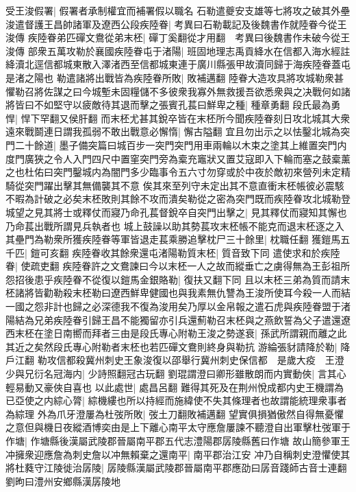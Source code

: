 受王浚假署|{
	假署者承制權宜而補署假以職名}
石勒遣夔安支雄等七將攻之破其外壘浚遣督護王昌帥諸軍及遼西公段疾陸眷|{
	考異曰石勒載記及後魏書作就陸眷今從王浚傳}
疾陸眷弟匹磾文鴦從弟末柸|{
	磾丁奚翻從才用翻　考異曰後魏書作未破今從王浚傳}
部衆五萬攻勒於襄國疾陸眷屯于渚陽|{
	班固地理志禹貢絳水在信都入海水經註絳瀆北逕信都城東散入澤渚西至信都城東連于廣川縣張甲故瀆同歸于海疾陸眷蓋屯是渚之陽也}
勒遣諸將出戰皆為疾陸眷所敗|{
	敗補邁翻}
陸眷大造攻具將攻城勒衆甚懼勒召將佐謀之曰今城塹未固糧儲不多彼衆我寡外無救援吾欲悉衆與之决戰何如諸將皆曰不如堅守以疲敵待其退而擊之張賓孔萇曰鮮卑之種|{
	種章勇翻}
段氏最為勇悍|{
	悍下罕翻又侯肝翻}
而末柸尤甚其銳卒皆在末柸所今聞疾陸眷刻日攻北城其大衆遠來戰鬬連日謂我孤弱不敢出戰意必懈惰|{
	懈古隘翻}
宜且勿出示之以怯鑿北城為突門二十餘道|{
	墨子備突篇曰城百步一突門突門用車兩輪以木束之塗其上維置突門内度門廣狹之令人入門四尺中置窐突門旁為槖充竈狀又置艾寇即入下輪而塞之鼓槖薰之也杜佑曰突門鑿城内為闇門多少臨事令五六寸勿穿或於中夜於敵初來營列未定精騎從突門躍出擊其無備襲其不意}
俟其來至列守未定出其不意直衝末柸帳彼必震駭不暇為計破之必矣末柸敗則其餘不攻而潰矣勒從之密為突門既而疾陸眷攻北城勒登城望之見其將士或釋仗而寢乃命孔萇督銳卒自突門出擊之|{
	見其釋仗而寢知其懈也乃命萇出戰所謂見兵執者也}
城上鼓譟以助其勢萇攻末柸帳不能克而退末柸逐之入其壘門為勒衆所獲疾陸眷等軍皆退走萇乘勝追擊枕尸三十餘里|{
	枕職任翻}
獲鎧馬五千匹|{
	鎧可亥翻}
疾陸眷收其餘衆還屯渚陽勒質末柸|{
	質音致下同}
遣使求和於疾陸眷|{
	使疏吏翻}
疾陸眷許之文鴦諫曰今以末柸一人之故而縱垂亡之虜得無為王彭祖所怨招後患乎疾陸眷不從復以鎧馬金銀賂勒|{
	復扶又翻下同}
且以末柸三弟為質而請末柸諸將皆勸勒殺末柸勒曰遼西鮮卑健國也與我素無仇讐為王浚所使耳今殺一人而結一國之怨非計也歸之必深德我不復為浚用矣乃厚以金帛報之遣石虎與疾陸眷盟于渚陽結為兄弟疾陸眷引歸王昌不能獨留亦引兵還薊勒召末柸與之燕飲誓為父子遣還遼西末柸在塗日南嚮而拜者三由是段氏專心附勒王浚之勢遂衰|{
	孫武所謂親而離之此其近之矣然段氏專心附勒者末柸也若匹磾文鴦則終身與勒抗}
游綸張豺請降於勒|{
	降戶江翻}
勒攻信都殺冀州刺史王象浚復以邵舉行冀州刺史保信都　是歲大疫　王澄少與兄衍名冠海内|{
	少詩照翻冠古玩翻}
劉琨謂澄曰卿形雖散朗而内實動俠|{
	言其心輕易動又豪俠自喜也}
以此處世|{
	處昌呂翻}
難得其死及在荆州悅成都内史王機謂為已亞使之内綜心膂|{
	綜機縷也所以持經而施緯使不失其條理者也故謂能統理衆事者為綜理}
外為爪牙澄屢為杜弢所敗|{
	弢土刀翻敗補邁翻}
望實俱損猶傲然自得無憂懼之意但與機日夜縱酒博奕由是上下離心南平太守應詹屢諫不聽澄自出軍擊杜弢軍于作塘|{
	作塘縣後漢屬武陵郡晉屬南平郡五代志澧陽郡孱陵縣舊曰作塘}
故山簡參軍王冲擁衆迎應詹為刺史詹以冲無賴棄之還南平|{
	南平郡治江安}
冲乃自稱刺史澄懼使其將杜蕤守江陵徙治孱陵|{
	孱陵縣漢屬武陵郡晉屬南平郡應劭曰孱音踐師古音士連翻劉昫曰澧州安鄉縣漢孱陵地}

